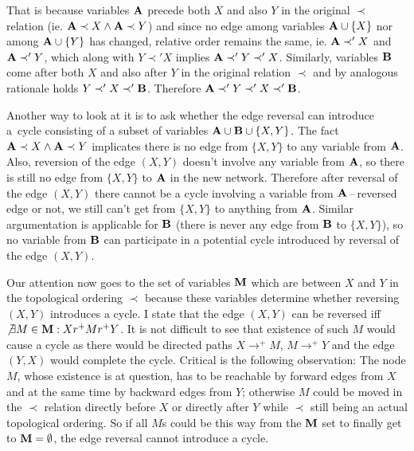 \documentclass[english,cover]{fitthesis} %
\newcommand{\vars}[1]{{\bold{#1}}}         %
\begin{document}
\begin{adjustwidth}{1cm}{0cm}
That is because variables $\vars{A}$ precede both $X$ and also $Y$ in the original $\prec$ relation (ie. $\vars{A} \prec X \land \vars{A} \prec Y$) and since no edge among variables $\vars{A} \cup \lbrace X \rbrace$ nor among $\vars{A} \cup \lbrace Y \rbrace$ has changed, relative order remains the same, ie. $\vars{A} \prec' X$ and $\vars{A} \prec' Y$, which along with $Y \prec' X$ implies $\vars{A} \prec' Y \prec' X$. Similarly, variables $\vars{B}$ come after both $X$ and also after $Y$ in the original relation $\prec$ and by analogous rationale holds $Y \prec' X \prec' \vars{B}$. Therefore $\vars{A} \prec' Y \prec' X \prec' \vars{B}$.
	
Another way to look at it is to ask whether the edge reversal can introduce a~cycle consisting of a subset of variables $\vars{A} \cup \vars{B} \cup \lbrace X,Y \rbrace$. The fact $\vars{A} \prec X \land \vars{A} \prec Y$ implicates there is no edge from $\lbrace X, Y \rbrace$ to any variable from $\vars{A}$. Also, reversion of the edge $(X,Y)$ doesn't involve any variable from $\vars{A}$, so there is still no edge from $\lbrace X,Y \rbrace$ to $\vars{A}$ in the new network. Therefore after reversal of the edge $(X,Y)$ there cannot be a cycle involving a variable from $\vars{A}$\,--\,reversed edge or not, we still can't get from $\lbrace X,Y \rbrace$ to anything from $\vars{A}$. Similar argumentation is applicable for $\vars{B}$ (there is never any edge from $\vars{B}$ to $\lbrace X,Y \rbrace$), so no variable from $\vars{B}$ can participate in a potential cycle introduced by reversal of the edge $(X,Y)$.
\end{adjustwidth}
Our attention now goes to the set of variables $\vars{M}$ which are between $X$ and $Y$ in the topological ordering $\prec$ because these variables determine whether reversing $(X,Y)$ introduces a cycle. I state that the edge $(X,Y)$ can be reversed iff $\not \exists M \in \vars{M}: Xr^+Mr^+Y$. It is not difficult to see that existence of such $M$ would cause a cycle as there would be directed paths $X \rightarrow^+ M$, $M \rightarrow^+ Y$ and the edge $(Y,X)$ would complete the cycle. Critical is the following observation: The node $M$, whose existence is at question, has to be reachable by forward edges from $X$ and at the same time by backward edges from $Y$; otherwise $M$ could be moved in the $\prec$ relation directly before $X$ or directly after $Y$ while $\prec$ still being an actual topological ordering. So if all $M$s could be this way  from the $\vars{M}$ set to finally get to $\vars{M} = \emptyset$, the edge reversal cannot introduce a cycle.
\end{document}
